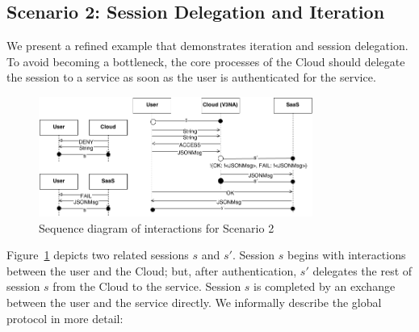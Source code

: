 \documentclass[10pt]{llncs}
\begin{document}
\subsection{Scenario 2: Session Delegation and Iteration}

We present a refined example that demonstrates iteration and session delegation. To avoid becoming a bottleneck, the core processes of the Cloud should delegate the session to a service as soon as the user is authenticated for the service. 

\begin{figure}
\centering
\includegraphics[width=0.8\textwidth]{resources/diag-2.png} %
\caption{Sequence diagram of interactions for Scenario 2}
\label{fig:seq-diagram-sc2}
\end{figure}

Figure~\ref{fig:seq-diagram-sc2} depicts two related sessions $s$ and $s'$. Session $s$ begins with interactions between the user and the Cloud; but, after authentication, $s'$ delegates the rest of session $s$ from the Cloud to the service. Session $s$ is completed by an exchange between the user and the service directly.
We informally describe the global protocol in more detail:
\end{document}
